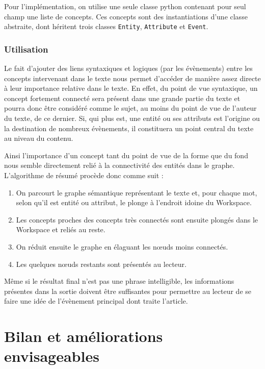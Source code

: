 \documentclass[a4paper, 12pt]{article}
\newcommand{\pyt}[1]{\texttt{#1}}%
\begin{document}
Pour l'implémentation, on utilise une seule classe python contenant pour seul champ une liste de concepts. Ces concepts sont des instantiations d'une classe abstraite, dont héritent trois classes \pyt{Entity}, \pyt{Attribute} et \pyt{Event}.


\subsubsection{Utilisation}

Le fait d'ajouter des liens syntaxiques et logiques (par les évènements) entre les concepts intervenant dans le texte nous permet d'accéder de manière assez directe à leur importance relative dans le texte. En effet, du point de vue syntaxique, un concept fortement connecté sera présent dans une grande partie du texte et pourra donc être considéré comme le sujet, au moins du point de vue de l'auteur du texte, de ce dernier. Si, qui plus est, une entité ou ses attributs est l'origine ou la destination de nombreux évènements, il constituera un point central du texte au niveau du contenu.

Ainsi l'importance d'un concept tant du point de vue de la forme que du fond nous semble directement relié à la connectivité des entités dans le graphe. L'algorithme de résumé procède donc comme suit :

\begin{enumerate}
	\item On parcourt le graphe sémantique représentant le texte et, pour chaque mot, selon qu'il est entité ou attribut, le plonge à l'endroit idoine du Workspace.
	\item Les concepts proches des concepts très connectés sont ensuite plongés dans le Workspace et reliés au reste.
	\item On réduit ensuite le graphe en élaguant les nœuds moins connectés.
	\item Les quelques nœuds restants sont présentés au lecteur.
\end{enumerate}

Même si le résultat final n'est pas une phrase intelligible, les informations présentes dans la sortie doivent être suffisantes pour permettre au lecteur de se faire une idée de l'évènement principal dont traite l'article.


\section{Bilan et améliorations envisageables}
\end{document}

